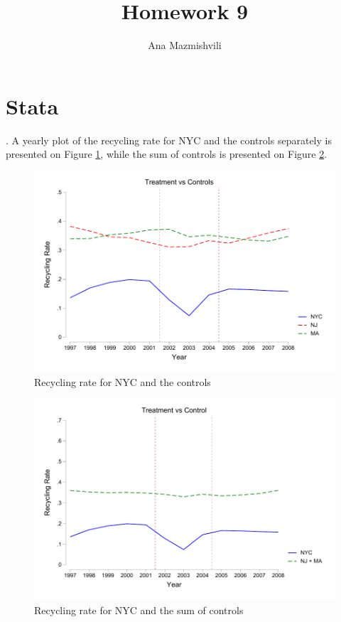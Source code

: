 \documentclass{article}
\title{Homework 9}
\author{Ana Mazmishvili}
\begin{document}
  
\maketitle

\section{Stata}
.  A yearly plot of the recycling rate for NYC and the controls separately is presented on Figure \ref{fig:NYCNJMA}, while the sum of controls is presented on Figure \ref{fig:NYCvsControls}. 

\begin{figure}[h!]
    \centering
    \includegraphics{homework 9/output/figure/treatedvscontrol.pdf}
    \caption{Recycling rate for NYC and the controls}
    \label{fig:NYCNJMA}
\end{figure}

\begin{figure}[h!]
    \centering
    \includegraphics{homework 9/output/figure/linechartrecyclingrate.pdf}
    \caption{Recycling rate for NYC and the sum of controls}
    \label{fig:NYCvsControls}
\end{figure}
\end{document}
